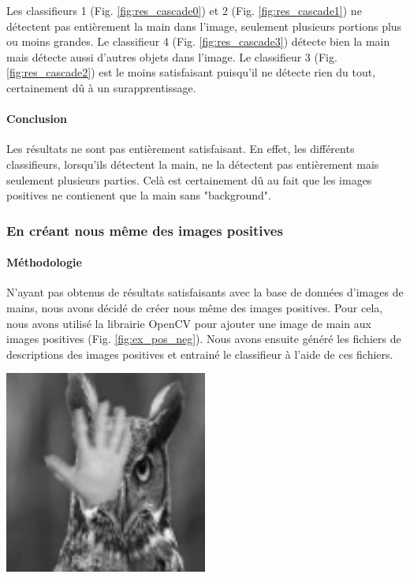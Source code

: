 \documentclass[11pt]{article}
\begin{document}
\bigbreak

Les classifieurs 1 (Fig. \ref{fig:res_cascade0}) et 2 (Fig. \ref{fig:res_cascade1}) ne détectent pas entièrement la main dans l'image, seulement plusieurs portions plus ou moins grandes. Le classifieur 4 (Fig. \ref{fig:res_cascade3}) détecte bien la main mais détecte aussi d'autres objets dans l'image. Le classifieur 3 (Fig. \ref{fig:res_cascade2}) est le moins satisfaisant puisqu'il ne détecte rien du tout, certainement dû à un surapprentissage.

\paragraph{Conclusion}
Les résultats ne sont pas entièrement satisfaisant. En effet, les différents classifieurs, lorsqu'ils détectent la main, ne la détectent pas entièrement mais seulement plusieurs parties. Celà est certainement dû au fait que les images positives ne contienent que la main sans "background". 

\subsubsection{En créant nous même des images positives}
\paragraph{Méthodologie}
N'ayant pas obtenus de résultats satisfaisants avec la base de données d'images de mains, nous avons décidé de créer nous même des images positives. Pour cela, nous avons utilisé la librairie OpenCV pour ajouter une image de main aux images positives (Fig. \ref{fig:ex_pos_neg}). Nous avons ensuite généré les fichiers de descriptions des images positives et entrainé le classifieur à l'aide de ces fichiers. \bigbreak

\begin{center}
    \includegraphics[width=0.5\textwidth]{images/ex_pos_neg.jpg}
    \label{fig:ex_pos_neg}
\end{center}
\end{document}
